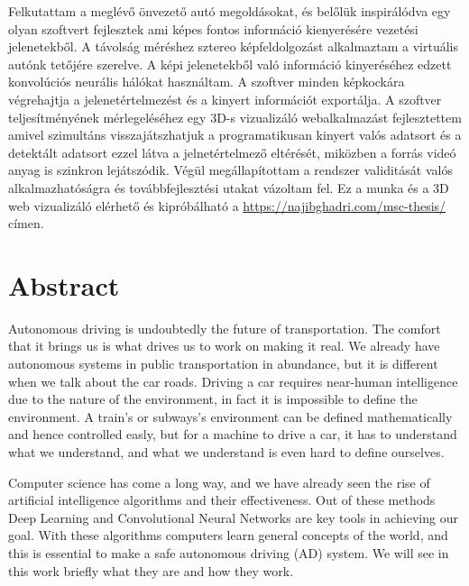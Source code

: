Felkutattam a meglévő önvezető autó megoldásokat, és belőlük inspirálódva egy
olyan szoftvert fejlesztek ami képes fontos információ kienyerésére vezetési
jelenetekből. A távolság méréshez sztereo képfeldolgozást alkalmaztam a
virtuális autónk tetőjére szerelve. A képi jelenetekből való információ
kinyeréséhez edzett konvolúciós neurális hálókat használtam. A szoftver minden
képkockára végrehajtja a jelenetértelmezést és a kinyert információt exportálja.
A szoftver teljesítményének mérlegeléséhez egy 3D-s vizualizáló webalkalmazást
fejlesztettem amivel szimultáns visszajátszhatjuk a programatikusan kinyert
valós adatsort és a detektált adatsort ezzel látva a jelnetértelmező eltérését,
miközben a forrás videó anyag is szinkron lejátszódik. Végül megállapítottam a
rendszer validitását valós alkalmazhatóságra és továbbfejlesztési utakat
vázoltam fel. Ez a munka és a 3D web vizualizáló elérhető és kipróbálható a
\url{https://najibghadri.com/msc-thesis/} címen.

\vfill
\selectenglish


\chapter*{Abstract}

Autonomous driving is undoubtedly the future of transportation. The comfort that
it brings us is what drives us to work on making it real. We already have
autonomous systems in public transportation in abundance, but it is different
when we talk about the car roads. Driving a car requires near-human intelligence
due to the nature of the environment, in fact it is impossible to define the
environment. A train's or subways's environment can be defined mathematically
and hence controlled easly, but for a machine to drive a car, it has to
understand what we understand, and what we understand is even hard to define
ourselves.

Computer science has come a long way, and we have already seen the rise of
artificial intelligence algorithms and their effectiveness. Out of these methods
Deep Learning and Convolutional Neural Networks are key tools in achieving our
goal. With these algorithms computers learn general concepts of the world, and
this is essential to make a safe autonomous driving (AD) system. We will see in
this work briefly what they are and how they work. 

